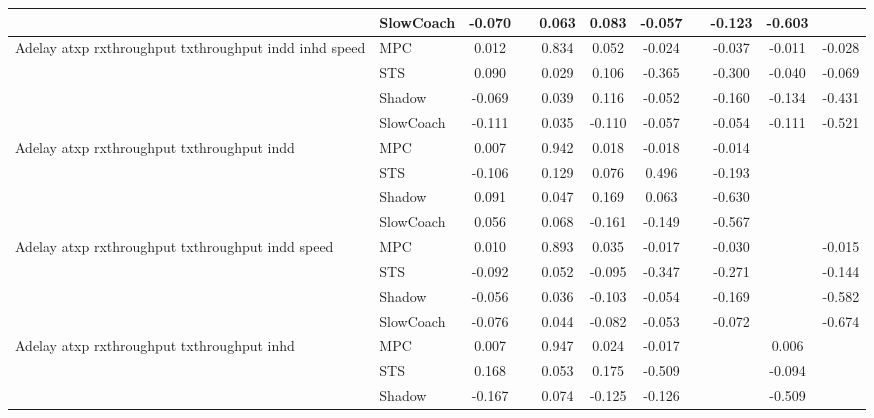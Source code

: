 \begin{tabular}{|l|l|*{9}{c|}}
                              & SlowCoach &   -0.070 &        &     0.063 &  0.083 & -0.057 &     &  -0.123 &  -0.603 &       \\
\midrule
Adelay atxp rxthroughput txthroughput indd inhd speed    & MPC &    0.012 &        &     0.834 &  0.052 & -0.024 &     &  -0.037 &  -0.011 &   -0.028 \\
                              & STS &    0.090 &        &     0.029 &  0.106 & -0.365 &     &  -0.300 &  -0.040 &   -0.069 \\
                              & Shadow &   -0.069 &        &     0.039 &  0.116 & -0.052 &     &  -0.160 &  -0.134 &   -0.431 \\
                              & SlowCoach &   -0.111 &        &     0.035 & -0.110 & -0.057 &     &  -0.054 &  -0.111 &   -0.521 \\
\midrule
Adelay atxp rxthroughput txthroughput indd    & MPC &    0.007 &        &     0.942 &  0.018 & -0.018 &     &  -0.014 &      &       \\
                              & STS &   -0.106 &        &     0.129 &  0.076 &  0.496 &     &  -0.193 &      &       \\
                              & Shadow &    0.091 &        &     0.047 &  0.169 &  0.063 &     &  -0.630 &      &       \\
                              & SlowCoach &    0.056 &        &     0.068 & -0.161 & -0.149 &     &  -0.567 &      &       \\
\midrule
Adelay atxp rxthroughput txthroughput indd speed    & MPC &    0.010 &        &     0.893 &  0.035 & -0.017 &     &  -0.030 &      &   -0.015 \\
                              & STS &   -0.092 &        &     0.052 & -0.095 & -0.347 &     &  -0.271 &      &   -0.144 \\
                              & Shadow &   -0.056 &        &     0.036 & -0.103 & -0.054 &     &  -0.169 &      &   -0.582 \\
                              & SlowCoach &   -0.076 &        &     0.044 & -0.082 & -0.053 &     &  -0.072 &      &   -0.674 \\
\midrule
Adelay atxp rxthroughput txthroughput inhd    & MPC &    0.007 &        &     0.947 &  0.024 & -0.017 &     &      &   0.006 &       \\
                              & STS &    0.168 &        &     0.053 &  0.175 & -0.509 &     &      &  -0.094 &       \\
                              & Shadow &   -0.167 &        &     0.074 & -0.125 & -0.126 &     &      &  -0.509 &       \\

\end{tabular}
